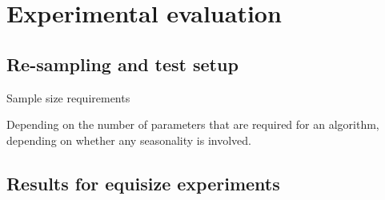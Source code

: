\section{Experimental evaluation}\label{sec:experiment}



\subsection{Re-sampling and test setup}
Sample size requirements \cite{hanke2001business}

Depending on the number of parameters that are required for an algorithm, depending on whether any seasonality is involved. 

\subsection{Results for equisize experiments}